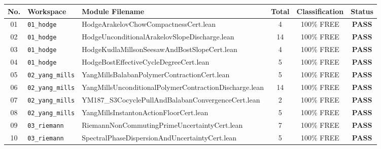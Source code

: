 \documentclass[11pt,a4paper]{article}
\begin{document}
\begin{table}[h!]
\centering
\footnotesize
\begin{tabularx}{\textwidth}{cllccc}
\toprule
\textbf{No.} & \textbf{Workspace} & \textbf{Module Filename} & \textbf{Total} & \textbf{Classification} & \textbf{Status} \\
\midrule
01 & \texttt{01\_hodge} & {\scriptsize\ttfamily Hodge\allowbreak Arakelov\allowbreak Chow\allowbreak Compactness\allowbreak Cert.lean} & 4 & 100\% FREE & \textbf{PASS} \\
02 & \texttt{01\_hodge} & {\scriptsize\ttfamily Hodge\allowbreak Unconditional\allowbreak Arakelov\allowbreak Slope\allowbreak Discharge.lean} & 14 & 100\% FREE & \textbf{PASS} \\
03 & \texttt{01\_hodge} & {\scriptsize\ttfamily Hodge\allowbreak Kudla\allowbreak Millson\allowbreak Seesaw\allowbreak And\allowbreak Bost\allowbreak Slope\allowbreak Cert.lean} & 4 & 100\% FREE & \textbf{PASS} \\
04 & \texttt{01\_hodge} & {\scriptsize\ttfamily Hodge\allowbreak Bost\allowbreak Effective\allowbreak Cycle\allowbreak Degree\allowbreak Cert.lean} & 5 & 100\% FREE & \textbf{PASS} \\
05 & \texttt{02\_yang\_mills} & {\scriptsize\ttfamily Yang\allowbreak Mills\allowbreak Balaban\allowbreak Polymer\allowbreak Contraction\allowbreak Cert.lean} & 5 & 100\% FREE & \textbf{PASS} \\
06 & \texttt{02\_yang\_mills} & {\scriptsize\ttfamily Yang\allowbreak Mills\allowbreak Unconditional\allowbreak Polymer\allowbreak Contraction\allowbreak Discharge.lean} & 14 & 100\% FREE & \textbf{PASS} \\
07 & \texttt{02\_yang\_mills} & {\scriptsize\ttfamily YM187\_\allowbreak \allowbreak S3\allowbreak Cocycle\allowbreak Pull\allowbreak And\allowbreak Balaban\allowbreak Convergence\allowbreak Cert.lean} & 2 & 100\% FREE & \textbf{PASS} \\
08 & \texttt{02\_yang\_mills} & {\scriptsize\ttfamily Yang\allowbreak Mills\allowbreak Instanton\allowbreak Action\allowbreak Floor\allowbreak Cert.lean} & 5 & 100\% FREE & \textbf{PASS} \\
09 & \texttt{03\_riemann} & {\scriptsize\ttfamily Riemann\allowbreak Non\allowbreak Commuting\allowbreak Prime\allowbreak Uncertainty\allowbreak Cert.lean} & 7 & 100\% FREE & \textbf{PASS} \\
10 & \texttt{03\_riemann} & {\scriptsize\ttfamily Spectral\allowbreak Phase\allowbreak Dispersion\allowbreak And\allowbreak Uncertainty\allowbreak Cert.lean} & 5 & 100\% FREE & \textbf{PASS} \\

\end{tabularx}
\end{table}
\end{document}

